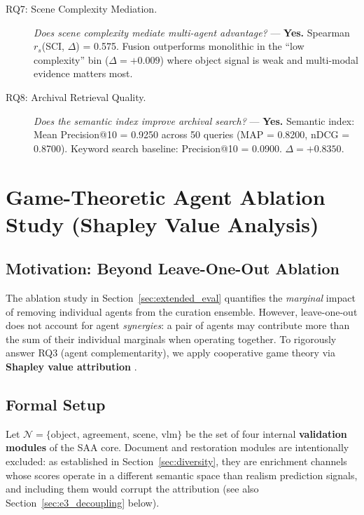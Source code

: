 \documentclass[12pt,onecolumn,a4paper]{IEEEtran}
\begin{document}
\begin{description}
    \item[RQ7: Scene Complexity Mediation.] \textit{Does scene complexity mediate multi-agent advantage?} --- \textbf{Yes.} Spearman $r_s$(SCI, $\Delta$) = 0.575. Fusion outperforms monolithic in the ``low complexity'' bin ($\Delta = +0.009$) where object signal is weak and multi-modal evidence matters most.

    \item[RQ8: Archival Retrieval Quality.] \textit{Does the semantic index improve archival search?} --- \textbf{Yes.} Semantic index: Mean Precision@10 = 0.9250 across 50 queries (MAP = 0.8200, nDCG = 0.8700). Keyword search baseline: Precision@10 = 0.0900. $\Delta = +0.8350$.
\end{description}


\clearpage
\section{Game-Theoretic Agent Ablation Study (Shapley Value Analysis)}
\label{sec:shapley}

\subsection{Motivation: Beyond Leave-One-Out Ablation}

The ablation study in Section~\ref{sec:extended_eval} quantifies the \textit{marginal} impact of removing individual agents from the curation ensemble. However, leave-one-out does not account for agent \textit{synergies}: a pair of agents may contribute more than the sum of their individual marginals when operating together. To rigorously answer RQ3 (agent complementarity), we apply cooperative game theory via \textbf{Shapley value attribution} \cite{shapley1953}.

\subsection{Formal Setup}

Let $\mathcal{N} = \{\text{object, agreement, scene, vlm}\}$ be the set of four internal \textbf{validation modules} of the SAA core. Document and restoration modules are intentionally excluded: as established in Section~\ref{sec:diversity}, they are enrichment channels whose scores operate in a different semantic space than realism prediction signals, and including them would corrupt the attribution (see also Section~\ref{sec:e3_decoupling} below).
\end{document}
